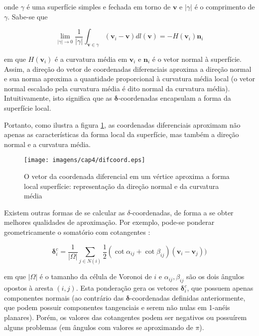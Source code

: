 \noindent onde $\gamma$ é uma superfície simples e fechada em torno de $\mathbf{v}$ e $|\gamma|$ é o comprimento de $\gamma$. Sabe-se que

\begin{equation}
	\lim_{|\gamma| \rightarrow 0} \frac{1}{|\gamma|} \int_{\mathbf{v} \in \gamma} (\mathbf{v}_i - \mathbf{v}) dl(\mathbf{v}) =  -H(\mathbf{v}_i)\mathbf{n}_i
\end{equation}


\noindent em que $H(\mathbf{v}_i)$ é a curvatura média em $\mathbf{v}_i$ e $\mathbf{n}_i$ é o vetor normal à superfície. Assim, a direção do vetor de coordenadas diferenciais aproxima a direção normal e sua norma aproxima a quantidade proporcional à curvatura média local (o vetor normal escalado pela curvatura média é dito normal da curvatura média). Intuitivamente, isto significa que as $\mathbf{\delta}$-coordenadas encapsulam a forma da superfície local.

Portanto, como ilustra a figura \ref{fig:coordDif}, as coordenadas diferenciais aproximam não apenas as características da forma local da superfície, mas também a direção normal e a curvatura média. 

\begin{figure}[htb]
	\centering
	\texttt{[image: imagens/cap4/difcoord.eps]}
	\caption{O vetor da coordenada diferencial em um vértice aproxima a forma local superfície: representação da direção normal e da curvatura média \cite{sorkine2006}}
	\label{fig:coordDif}
\end{figure}

Existem outras formas de se calcular as $\delta$-coordenadas, de forma a se obter melhores qualidades de aproximação. Por exemplo, pode-se ponderar geometricamente o somatório com cotangentes \cite{pinkall:1996}:

\begin{equation}
	\mathbf{\delta}_i^c = \frac{1}{|\Omega|} \sum_{j \in N(i)} \frac{1}{2} (\cot \alpha_{ij} + \cot \beta_{ij})(\mathbf{v}_i - \mathbf{v}_j))
\end{equation}

\noindent em que $|\Omega|$ é o tamanho da célula de Voronoi de $i$ e $\alpha_{ij}, \beta_{ij}$ são os dois ângulos opostos à aresta $(i, j)$. Esta ponderação gera os vetores $\mathbf{\delta}_i^c$, que possuem apenas componentes normais (ao contrário das $\mathbf{\delta}$-coordenadas definidas anteriormente, que podem possuir componentes tangenciais e serem não nulas em 1-anéis planares). Porém, os valores das cotangentes podem ser negativos ou possuírem alguns problemas (em ângulos com valores se aproximando de $\pi$).
